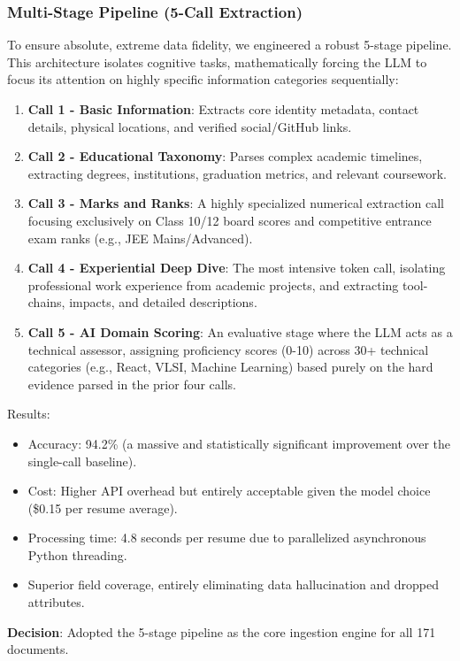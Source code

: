 \documentclass[12pt,a4paper]{report}
\begin{document}
\subsubsection{Multi-Stage Pipeline (5-Call Extraction)}
To ensure absolute, extreme data fidelity, we engineered a robust 5-stage pipeline. This architecture isolates cognitive tasks, mathematically forcing the LLM to focus its attention on highly specific information categories sequentially:
\begin{enumerate}
    \item \textbf{Call 1 - Basic Information}: Extracts core identity metadata, contact details, physical locations, and verified social/GitHub links.
    \item \textbf{Call 2 - Educational Taxonomy}: Parses complex academic timelines, extracting degrees, institutions, graduation metrics, and relevant coursework.
    \item \textbf{Call 3 - Marks and Ranks}: A highly specialized numerical extraction call focusing exclusively on Class 10/12 board scores and competitive entrance exam ranks (e.g., JEE Mains/Advanced).
    \item \textbf{Call 4 - Experiential Deep Dive}: The most intensive token call, isolating professional work experience from academic projects, and extracting tool-chains, impacts, and detailed descriptions.
    \item \textbf{Call 5 - AI Domain Scoring}: An evaluative stage where the LLM acts as a technical assessor, assigning proficiency scores (0-10) across 30+ technical categories (e.g., React, VLSI, Machine Learning) based purely on the hard evidence parsed in the prior four calls.
\end{enumerate}

Results:
\begin{itemize}
    \item Accuracy: 94.2\% (a massive and statistically significant improvement over the single-call baseline).
    \item Cost: Higher API overhead but entirely acceptable given the model choice (\$0.15 per resume average).
    \item Processing time: 4.8 seconds per resume due to parallelized asynchronous Python threading.
    \item Superior field coverage, entirely eliminating data hallucination and dropped attributes.
\end{itemize}

\textbf{Decision}: Adopted the 5-stage pipeline as the core ingestion engine for all 171 documents.
\end{document}
